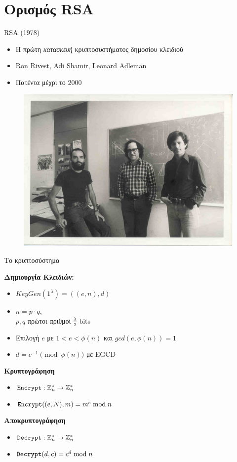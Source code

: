 \documentclass[handout]{beamer}
\begin{document}
\section{Ορισμός RSA}
\begin{frame}{RSA (1978)}
\begin{itemize}
\item Η πρώτη \emph{κατασκευή} κρυπτοσυστήματος δημοσίου κλειδιού
\item Ron Rivest, Adi Shamir, Leonard Adleman
\item Πατέντα μέχρι το 2000
\end{itemize}

\begin{figure}
\includegraphics[scale=0.8]{rsa-photo.jpg}  
\end{figure}
\end{frame}

\begin{frame}{Το κρυπτοσύστημα}

 
\textbf{Δημιουργία Κλειδιών:}
\begin{itemize}
\item $KeyGen(1^{\lambda}) = ((e,n),d)$
\item $n=p \cdot q$, 
\\$p,q$ πρώτοι αριθμοί $\frac{\lambda}{2}$ bits
\item Επιλογή $e$ με $1 < e < \phi(n)$ 
και $gcd(e,\phi(n))=1$
\item $d = e^{-1} \pmod{\phi(n)}$ με EGCD
\end{itemize}
\pause
\textbf{Κρυπτογράφηση} 
\begin{itemize}
\item $\mathtt{Encrypt} : \mathbb{Z}^*_n \rightarrow \mathbb{Z}^*_n$
\item $\mathtt{Encrypt}((e,N), m) = m^e \bmod n$
\end{itemize}
\pause
\textbf{Αποκρυπτογράφηση}
\begin{itemize}
\item $\mathtt{Decrypt} : \mathbb{Z}^*_n \rightarrow \mathbb{Z}^*_n$
\item $\mathtt{Decrypt}(d, c) = c^d \bmod n$
\end{itemize} 
 
\end{frame}
\end{document}

